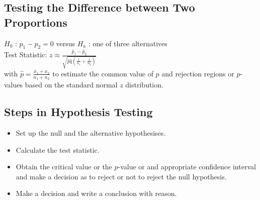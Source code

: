 \documentclass[12pt, letterpaper]{article}
\begin{document}
        \subsection{Testing the Difference between Two Proportions}
            \begin{mdframed}[leftmargin=0.5cm, rightmargin=0.5cm]
                \begin{flushleft}
                    $H_0$ : $p_1 - p_2 = 0$ versus $H_a$ : one of three alternatives \\ 
                    Test Statistic: $z \approx {\frac{\hat{p}_1 - \hat{p}_2}{\sqrt{\hat{p}\hat{q}\left(\frac{1}{n_1}+\frac{1}{n_2}\right)}}}$ \\
                    with $\hat{p} = \frac{x_1 + x_2}{n_1 + n_2}$ to estimate the common value of $p$ and rejection regions or $p$-values based on the standard normal $z$ distribution.
                \end{flushleft}
            \end{mdframed}
        \subsection{Steps in Hypothesis Testing}
            \begin{itemize}
                \item Set up the null and the alternative hypothesises.
                \item Calculate the test statistic.
                \item Obtain the critical value or the $p$-value or and appropriate confidence interval and make a decision as to reject or not to reject the null hypothesis.
                \item Make a decision and write a conclusion with reason.
            \end{itemize}
\end{document}
